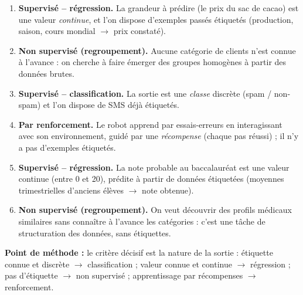 \documentclass[11pt]{article}
\begin{document}
\begin{corrige}
\begin{enumerate}
\item \textbf{Supervisé -- régression.} La grandeur à prédire (le prix du sac de cacao) est une valeur \emph{continue}, et l'on dispose d'exemples passés étiquetés (production, saison, cours mondial $\to$ prix constaté).
\item \textbf{Non supervisé (regroupement).} Aucune catégorie de clients n'est connue à l'avance : on cherche à faire émerger des groupes homogènes à partir des données brutes.
\item \textbf{Supervisé -- classification.} La sortie est une \emph{classe} discrète (spam / non-spam) et l'on dispose de SMS déjà étiquetés.
\item \textbf{Par renforcement.} Le robot apprend par essais-erreurs en interagissant avec son environnement, guidé par une \emph{récompense} (chaque pas réussi) ; il n'y a pas d'exemples étiquetés.
\item \textbf{Supervisé -- régression.} La note probable au baccalauréat est une valeur continue (entre 0 et 20), prédite à partir de données étiquetées (moyennes trimestrielles d'anciens élèves $\to$ note obtenue).
\item \textbf{Non supervisé (regroupement).} On veut découvrir des profils médicaux similaires sans connaître à l'avance les catégories : c'est une tâche de structuration des données, sans étiquettes.
\end{enumerate}
\textbf{Point de méthode :} le critère décisif est la nature de la sortie : étiquette connue et discrète $\to$ classification ; valeur connue et continue $\to$ régression ; pas d'étiquette $\to$ non supervisé ; apprentissage par récompenses $\to$ renforcement.
\end{corrige}
\end{document}
